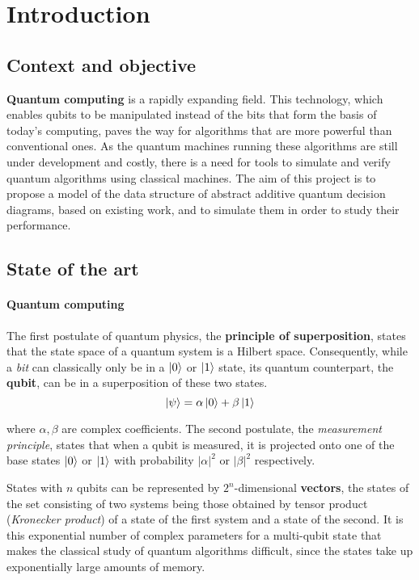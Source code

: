 \chapter{Introduction} %
\label{ch:Introduction}


\section{Context and objective}
\label{sec:Contexte}

\textbf{Quantum computing} is a rapidly expanding field. This technology, which enables qubits to be manipulated instead of the bits that form the basis of today's computing, paves the way for algorithms that are more powerful than conventional ones. As the quantum machines running these algorithms are still under development and costly, there is a need for tools to simulate and verify quantum algorithms using classical machines. The aim of this project is to propose a model of the data structure of abstract additive quantum decision diagrams, based on existing work, and to simulate them in order to study their performance.


\section{State of the art}
\label{sec:Etat}


\subsubsection*{Quantum computing}

The first postulate of quantum physics, the \textbf{principle of superposition}, states that the state space of a quantum system is a Hilbert space. Consequently, while a \textit{bit} can classically only be in a $\ket 0$ or $\ket 1$ state, its quantum counterpart, the \textbf{qubit}, can be in a superposition of these two states.
$$\ket \psi = \alpha \ket 0 + \beta \ket 1$$

\noindent where $\alpha, \beta$ are complex coefficients. The second postulate, the \textit{measurement principle}, states that when a qubit is measured, it is projected onto one of the base states $\ket 0$ or $\ket 1$ with probability $|\alpha|^2$ or $|\beta|^2$ respectively.

States with $n$ qubits can be represented by $2^n$-dimensional \textbf{vectors}, the states of the set consisting of two systems being those obtained by tensor product (\textit{Kronecker product}) of a state of the first system and a state of the second. It is this exponential number of complex parameters for a multi-qubit state that makes the classical study of quantum algorithms difficult, since the states take up exponentially large amounts of memory.

